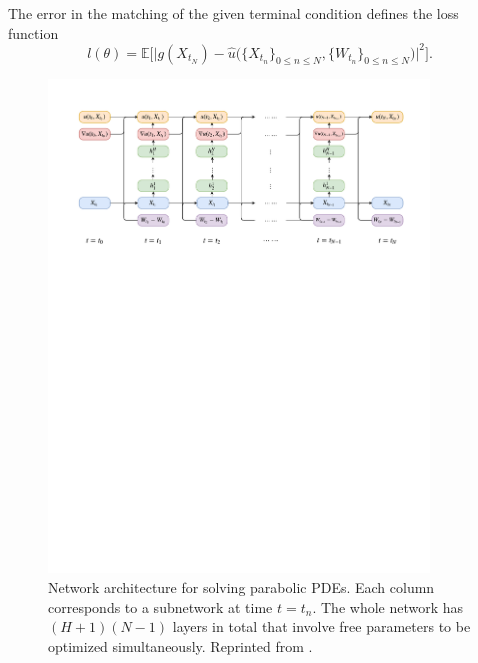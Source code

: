 \documentclass[12pt,AutoFakeBold,AutoFakeSlant]{article}
\theoremstyle{definition}
\newcommand{\E}{\mathbb{E}}
\begin{document}
	The error in the {matching of the given terminal condition} defines the  loss function 
		\begin{equation}
			l(\theta) = 
			\E\Big[
			\big|g( X_{ t_N } ) - \hat{u}\big(\{ X_{ t_n } \}_{ 0 \leq n \leq N } , \{ W_{ t_n } \}_{ 0 \leq n \leq N }\big)\big|^2
			\Big].
		\end{equation}


	\begin{figure}[H]
	\centering
	\includegraphics[width=0.9\textwidth]{./figs/nn_architecture_PDE.pdf}
	\caption{Network architecture for solving parabolic PDEs. Each column corresponds to a subnetwork at time $t=t_n$. The whole network has $(H+1)(N-1)$ layers in total that involve free parameters to be optimized simultaneously. 
	Reprinted from \cite{HanJentzenE2018}.}
	\end{figure}
\end{document}
